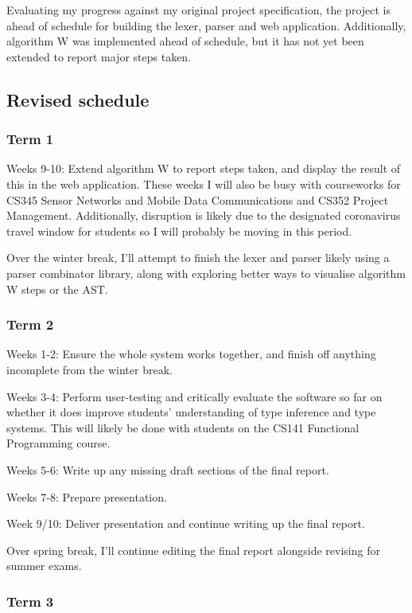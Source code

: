 \documentclass[a4paper,fleqn,12pt]{article}
\begin{document}
Evaluating my progress against my original project specification, the project is ahead of schedule for building the lexer, parser and web application. Additionally, algorithm W was implemented ahead of schedule, but it has not yet been extended to report major steps taken.

\subsection{Revised schedule}\label{id:h.p9vfbpk6rnb6}

\subsubsection{Term 1}\label{id:h.p2x8af4pn3a5}

Weeks 9-10: Extend algorithm W to report steps taken, and display the result of this in the web application. These weeks I will also be busy with courseworks for CS345 Sensor Networks and Mobile Data Communications and CS352 Project Management. Additionally, disruption is likely due to the designated coronavirus travel window for students so I will probably be moving in this period.

Over the winter break, I’ll attempt to finish the lexer and parser likely using a parser combinator library, along with exploring better ways to visualise algorithm W steps or the AST.

\subsubsection{Term 2}\label{id:h.5axy8qlqt2n8}

Weeks 1-2: Ensure the whole system works together, and finish off anything incomplete from the winter break.

Weeks 3-4: Perform user-testing and critically evaluate the software so far on whether it does improve students’ understanding of type inference and type systems. This will likely be done with students on the CS141 Functional Programming course.

Weeks 5-6: Write up any missing draft sections of the final report.

Weeks 7-8: Prepare presentation.

Week 9/10: Deliver presentation and continue writing up the final report.

Over spring break, I’ll continue editing the final report alongside revising for summer exams.

\subsubsection{Term 3}\label{id:h.jbcgtsb8n2zo}
\end{document}

